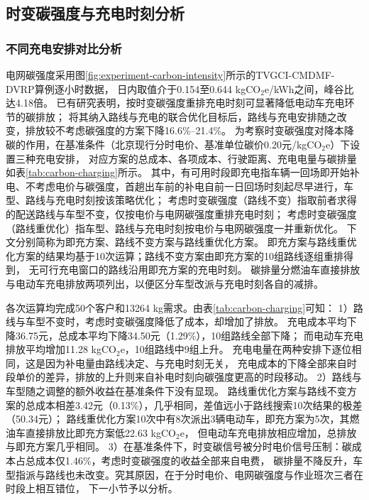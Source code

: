 \subsection{时变碳强度与充电时刻分析}

\subsubsection{不同充电安排对比分析}

电网碳强度采用图\ref{fig:experiment-carbon-intensity}所示的TVGCI-CMDMF-DVRP算例逐小时数据\cite{ref:82}，
日内取值介于0.154至0.644 kgCO$_2$e/kWh之间，峰谷比达4.18倍。
已有研究表明，按时变碳强度重排充电时刻可显著降低电动车充电环节的碳排放\cite{ref:52}；
将其纳入路线与充电的联合优化目标后，路线与充电安排随之改变，排放较不考虑碳强度的方案下降16.6\%--21.4\%\cite{ref:miyabe}。
为考察时变碳强度对降本降碳的作用，在基准条件（北京现行分时电价、基准单位碳价0.20元/kgCO$_2$e）下设置三种充电安排，
对应方案的总成本、各项成本、行驶距离、充电电量与碳排量如表\ref{tab:carbon-charging}所示。
其中，有可用时段即充电指车辆一回场即开始补电、不考虑电价与碳强度，首趟出车前的补电自前一日回场时刻起尽早进行，车型、路线与充电时刻按该策略优化；
考虑时变碳强度（路线不变）指取前者求得的配送路线与车型不变，仅按电价与电网碳强度重排充电时刻；
考虑时变碳强度（路线重优化）指车型、路线与充电时刻按电价与电网碳强度一并重新优化。
下文分别简称为即充方案、路线不变方案与路线重优化方案。
即充方案与路线重优化方案的结果均基于10次运算；路线不变方案由即充方案的10组路线逐组重排得到，
无可行充电窗口的路线沿用即充方案的充电时刻。
碳排量分燃油车直接排放与电动车充电排放两项列出，以便区分车型改派与充电时刻各自的减排。


各次运算均完成50个客户和13264 kg需求。由表\ref{tab:carbon-charging}可知：
1）路线与车型不变时，考虑时变碳强度降低了成本，却增加了排放。
充电成本平均下降36.75元，总成本平均下降34.50元（1.29\%），10组路线全部下降；
而电动车充电排放平均增加11.28 kgCO$_2$e，10组路线中9组上升。
充电电量在两种安排下逐位相同，这是因为补电量由路线决定、与充电时刻无关，
充电成本的下降全部来自时段单价的差异，排放的上升则来自补电时刻向碳强度更高的时段移动。
2）路线与车型随之调整的额外收益在基准条件下没有显现。
路线重优化方案与路线不变方案的总成本相差3.42元（0.13\%），几乎相同，差值远小于路线搜索10次结果的极差（50.34元）；
路线重优化方案10次中有8次派出3辆电动车，即充方案为5次，其燃油车直接排放比即充方案低22.63 kgCO$_2$e，
但电动车充电排放相应增加，总排放与即充方案几乎相同。
3）在基准条件下，时变碳信号被分时电价信号压制：碳成本占总成本仅1.46\%，考虑时变碳强度的收益全部来自电费，
碳排量不降反升，车型指派与路线也未改变。究其原因，在于分时电价、电网碳强度与作业班次三者在时段上相互错位，
下一小节予以分析。

